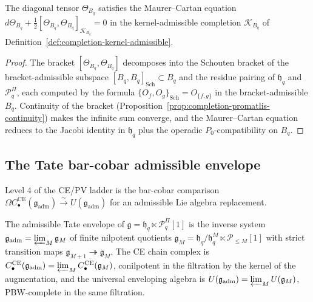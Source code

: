 \begin{thm}
\label{thm:completion-mc-kernel}
The diagonal tensor \(\Theta_{B_q}\) satisfies the Maurer--Cartan
equation
\(d\Theta_{B_q}+\tfrac12[\Theta_{B_q},\Theta_{B_q}]_{\mathcal K_{B_q}}=0\)
in the kernel-admissible completion \(\mathcal K_{B_q}\) of
Definition~\ref{def:completion-kernel-admissible}.
\end{thm}

\begin{proof}
The bracket
\([\Theta_{B_q},\Theta_{B_q}]\) decomposes into the
Schouten bracket of the bracket-admissible subspace
\([B_q,B_q]_{\mathrm{Sch}}\subset B_q\) and the residue pairing of
\(\mathfrak h_q\) and \(\mathcal P^\Pi_q\), each computed by the
formula
\(\{O_f,O_g\}_{\mathrm{Sch}}=O_{\{f,g\}}\) in the bracket-admissible
\(B_q\).  Continuity of the bracket
(Proposition~\ref{prop:completion-promatlis-continuity}) makes the
infinite sum converge, and the Maurer--Cartan equation reduces to
the Jacobi identity in \(\mathfrak h_q\) plus the operadic
\(P_0\)-compatibility on \(B_q\).
\end{proof}

\subsection{The Tate bar-cobar admissible envelope}
\label{ssec:completion-tate-bar-cobar}

Level 4 of the CE/PV ladder is the bar-cobar comparison
\(\Omega C^{\mathrm{CE}}_\bullet(\mathfrak g_{\mathrm{adm}})\xrightarrow{\sim}
U(\mathfrak g_{\mathrm{adm}})\) for an admissible Lie algebra
replacement.

\begin{defn}
\label{def:completion-admissible-tate}
The admissible Tate envelope of
\(\mathfrak g=\mathfrak h_q\ltimes\mathcal P^\Pi_q[1]\) is the
inverse system
\(\mathfrak g_{\mathrm{adm}}=\varprojlim_M\mathfrak g_M\) of finite
nilpotent quotients
\(\mathfrak g_M=\mathfrak h_q/\mathfrak h_q^M\ltimes
\mathcal P_{\le M}[1]\) with strict transition maps
\(\mathfrak g_{M+1}\twoheadrightarrow\mathfrak g_M\).  The CE chain
complex is
\(C^{\mathrm{CE}}_\bullet(\mathfrak g_{\mathrm{adm}})
=\varprojlim_M C^{\mathrm{CE}}_\bullet(\mathfrak g_M)\), conilpotent
in the filtration by the kernel of the augmentation, and the
universal enveloping algebra is
\(U(\mathfrak g_{\mathrm{adm}})=\varprojlim_M U(\mathfrak g_M)\),
PBW-complete in the same filtration.
\end{defn}

